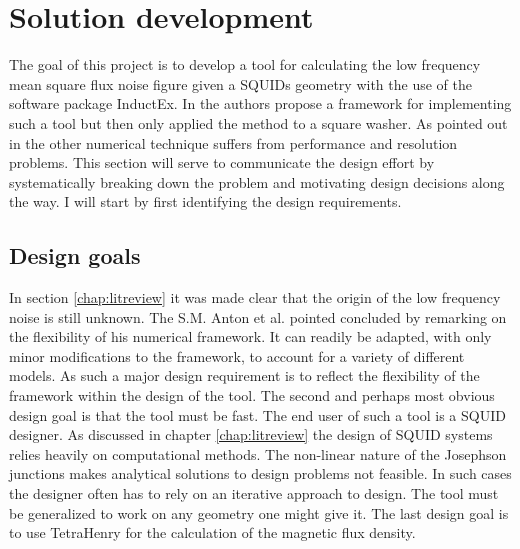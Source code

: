 \graphicspath{{solutiondevelopment/fig/}}

\chapter{Solution development}
\label{chap:solutiondevelopment}
The goal of this project is to develop a tool for calculating the low frequency mean square flux noise figure given a SQUIDs geometry with the use of the software package InductEx. In \cite{fluxNoiseSquidsStevenAnton} the authors propose a framework for implementing such a tool but then only applied the method to a square washer. As pointed out in \cite{fluxNoiseSquidsStevenAnton} the other numerical technique suffers from performance and resolution problems. This section will serve to communicate the design effort by systematically breaking down the problem and motivating design decisions along the way. I will start by first identifying the design requirements.

\section{Design goals}
In section \ref{chap:litreview} it was made clear that the origin of the low frequency noise is still unknown. The S.M. Anton et al. pointed concluded \cite{fluxNoiseSquidsStevenAnton} by remarking on the flexibility of his numerical framework. It can readily be adapted, with only minor modifications to the framework, to account for a variety of different models. As such a major design requirement is to reflect the flexibility of the framework within the design of the tool.
The second and perhaps most obvious design goal is that the tool must be fast. The end user of such a tool is a SQUID designer. As discussed in chapter \ref{chap:litreview} the design of SQUID systems relies heavily on computational methods. The non-linear nature of the Josephson junctions makes analytical solutions to design problems not feasible. In such cases the designer often has to rely on an iterative approach to design.
The tool must be generalized to work on any geometry one might give it.
The last design goal is to use TetraHenry for the calculation of the magnetic flux density. 

